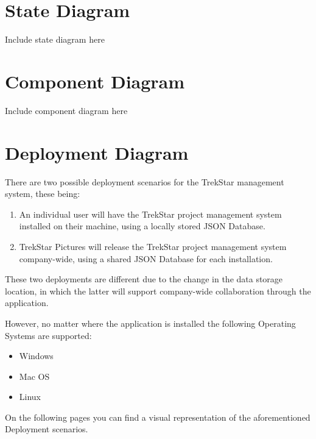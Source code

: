 \documentclass[
  english,
  a4paper,
,tablecaptionabove
]{scrartcl}
\providecommand{\tightlist}{%
  \setlength{\itemsep}{0pt}\setlength{\parskip}{0pt}}
\begin{document}
\newpage

\hypertarget{state-diagram}{%
\section{State Diagram}\label{state-diagram}}

Include state diagram here

\newpage

\hypertarget{component-diagram}{%
\section{Component Diagram}\label{component-diagram}}

Include component diagram here

\newpage

\hypertarget{deployment-diagram}{%
\section{Deployment Diagram}\label{deployment-diagram}}

There are two possible deployment scenarios for the TrekStar management
system, these being:

\begin{enumerate}
\def\labelenumi{\arabic{enumi}.}
\tightlist
\item
  An individual user will have the TrekStar project management system
  installed on their machine, using a locally stored JSON Database.
\item
  TrekStar Pictures will release the TrekStar project management system
  company-wide, using a shared JSON Database for each installation.
\end{enumerate}

These two deployments are different due to the change in the data
storage location, in which the latter will support company-wide
collaboration through the application.

However, no matter where the application is installed the following
Operating Systems are supported:

\begin{itemize}
\tightlist
\item
  Windows
\item
  Mac OS
\item
  Linux
\end{itemize}

On the following pages you can find a visual representation of the
aforementioned Deployment scenarios.
\end{document}
